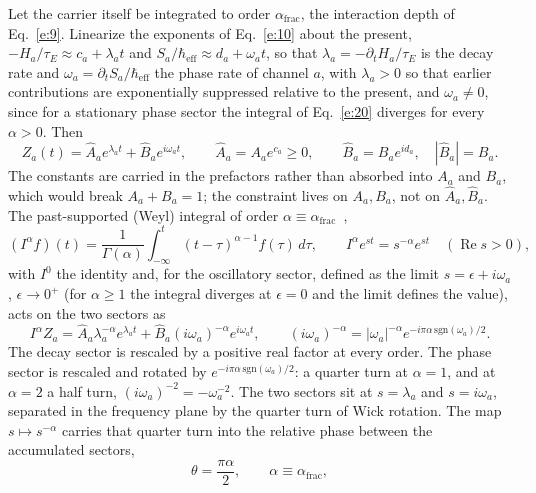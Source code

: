 \documentclass[10pt]{article}
\newcommand{\afrac}{\alpha_{\mathrm{frac}}}
\newcommand{\hbareff}{\hbar_{\mathrm{eff}}}
\DeclareMathOperator{\Real}{Re}
\begin{document}
Let the carrier itself be integrated to order $\afrac$, the interaction depth of Eq.~\eqref{e:9}. Linearize the exponents of Eq.~\eqref{e:10} about the present, $-H_a/\tau_E\approx c_a+\lambda_at$ and $S_a/\hbareff\approx d_a+\omega_at$, so that $\lambda_a=-\partial_tH_a/\tau_E$ is the decay rate and $\omega_a=\partial_tS_a/\hbareff$ the phase rate of channel $a$, with $\lambda_a>0$ so that earlier contributions are exponentially suppressed relative to the present, and $\omega_a\neq0$, since for a stationary phase sector the integral of Eq.~\eqref{e:20} diverges for every $\alpha>0$. Then
\begin{equation*}
Z_a(t)=\hat A_ae^{\lambda_at}+\hat B_ae^{i\omega_at},\qquad \hat A_a=A_ae^{c_a}\ge0,\qquad \hat B_a=B_ae^{id_a},\quad |\hat B_a|=B_a .
\end{equation*}
The constants are carried in the prefactors rather than absorbed into $A_a$ and $B_a$, which would break $A_a+B_a=1$; the constraint lives on $A_a,B_a$, not on $\hat A_a,\hat B_a$. The past-supported (Weyl) integral of order $\alpha\equiv\afrac$~\cite{samko,podlubny},
\begin{equation}
(I^\alpha f)(t)=\frac1{\Gamma(\alpha)}\int_{-\infty}^{t}(t-\tau)^{\alpha-1}f(\tau)\,d\tau,\qquad I^\alpha e^{st}=s^{-\alpha}e^{st}\quad(\Real s>0),\label{e:20}
\end{equation}
with $I^0$ the identity and, for the oscillatory sector, defined as the limit $s=\epsilon+i\omega_a$, $\epsilon\to0^+$ (for $\alpha\ge1$ the integral diverges at $\epsilon=0$ and the limit defines the value), acts on the two sectors as
\begin{equation}
I^\alpha Z_a=\hat A_a\lambda_a^{-\alpha}e^{\lambda_at}+\hat B_a(i\omega_a)^{-\alpha}e^{i\omega_at},\qquad (i\omega_a)^{-\alpha}=|\omega_a|^{-\alpha}e^{-i\pi\alpha\,\mathrm{sgn}(\omega_a)/2}.\label{e:21}
\end{equation}
The decay sector is rescaled by a positive real factor at every order. The phase sector is rescaled and rotated by $e^{-i\pi\alpha\,\mathrm{sgn}(\omega_a)/2}$: a quarter turn at $\alpha=1$, and at $\alpha=2$ a half turn, $(i\omega_a)^{-2}=-\omega_a^{-2}$. The two sectors sit at $s=\lambda_a$ and $s=i\omega_a$, separated in the frequency plane by the quarter turn of Wick rotation. The map $s\mapsto s^{-\alpha}$ carries that quarter turn into the relative phase between the accumulated sectors,
\begin{equation}
\theta=\frac{\pi\alpha}{2},\qquad \alpha\equiv\afrac,\label{e:22}
\end{equation}
\end{document}
